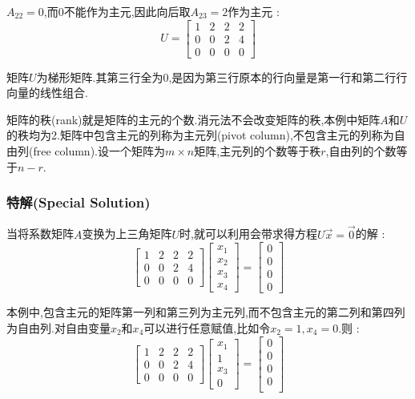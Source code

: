 \documentclass[UTF8,12pt]{ctexbook}
\begin{document}
{{{{{  $A_{22} = 0$,而0不能作为主元,因此向后取$A_{23} = 2$作为主元 :$$
    U
    =
    \begin{bmatrix}
      \boxed{1} & 2 & 2         & 2 \\
      0         & 0 & \boxed{2} & 4 \\
      0         & 0 & 0         & 0
    \end{bmatrix}
  $$

  矩阵$U$为梯形矩阵.其第三行全为0,是因为第三行原本的行向量是第一行和第二行行向量的线性组合.

  矩阵的秩(rank)就是矩阵的主元的个数.消元法不会改变矩阵的秩,本例中矩阵$A$和$U$的秩均为2.矩阵中包含主元的列称为主元列(pivot column),不包含主元的列称为自由列(free column).设一个矩阵为$m \times n$矩阵,主元列的个数等于秩$r$,自由列的个数等于$n - r$.
}%

\subsubsection{特解(Special Solution)}{
  当将系数矩阵$A$变换为上三角矩阵$U$时,就可以利用会带求得方程$U\vec{x} = \vec{0}$的解 : $$
    \begin{bmatrix}
      1 & 2 & 2 & 2 \\
      0 & 0 & 2 & 4 \\
      0 & 0 & 0 & 0
    \end{bmatrix}
    \begin{bmatrix}
      x_1 \\
      x_2 \\
      x_3 \\
      x_4
    \end{bmatrix}
    =
    \begin{bmatrix}
      0 \\
      0 \\
      0 \\
      0
    \end{bmatrix}
  $$

  本例中,包含主元的矩阵第一列和第三列为主元列,而不包含主元的第二列和第四列为自由列.对自由变量$x_2$和$x_4$可以进行任意赋值,比如令$x_2 = 1,x_4 = 0$.则 : $$
    \begin{bmatrix}
      1 & 2 & 2 & 2 \\
      0 & 0 & 2 & 4 \\
      0 & 0 & 0 & 0
    \end{bmatrix}
    \begin{bmatrix}
      x_1 \\
      1   \\
      x_3 \\
      0
    \end{bmatrix}
    =
    \begin{bmatrix}
      0 \\
      0 \\
      0 \\
      0 \\
    \end{bmatrix}
  $$

}}}}}
\end{document}
